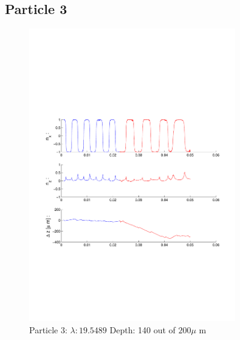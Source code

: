 \subsection{Particle 3}

\begin{figure}[H]

\includegraphics[width=0.8\textwidth]{Images/Particle 3/Particle3.pdf}

\caption{Particle 3:  $ \lambda: 19.5489$ Depth: 140 out of $200 \mu $ m}

\centering

\end{figure}

